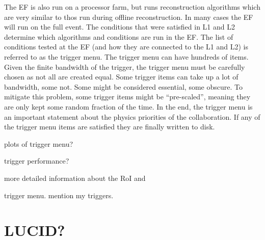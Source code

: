 The EF is also run on a processor farm, but runs reconstruction algorithms
which are very similar to thos run during offline reconstruction.
In many cases the EF will run on the full event. The conditions
that were satisfied in L1 and L2 determine which algorithms and conditions
are run in the EF.  The list of conditions tested at the EF (and 
how they are connected to the L1 and L2) is referred to as the trigger menu.
The trigger menu can have hundreds of items.
Given the finite bandwidth of the trigger, the trigger menu
must be carefully chosen as not all are created equal. Some 
trigger items can take up a lot of bandwidth, some not.
Some might be considered essential, some obscure.
To mitigate this problem, some trigger items might be ``pre-scaled'',
meaning they are only kept some random fraction of the time.
In the end, the trigger menu is an important statement about the physics
priorities of the collaboration.
If any of the trigger menu items are satisfied they are finally written to disk.

plots of trigger menu?

trigger performance?





more detailed information
about the RoI and 








trigger menu.
mention my triggers.






\section{LUCID?}
